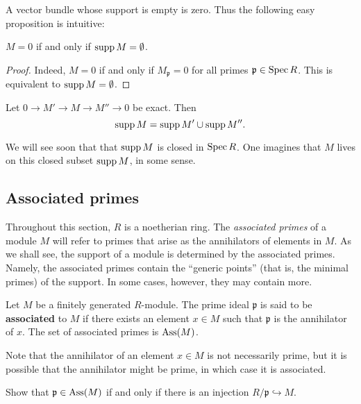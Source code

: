A vector bundle whose support is empty is zero. Thus the following easy
proposition is intuitive:

\begin{proposition} 
$M = 0$ if and only if $\operatorname{supp} M = \emptyset$. 
\end{proposition}
\begin{proof} 
Indeed, $M=0$ if and only if $M_{\mathfrak{p}} = 0$ for all primes
$\mathfrak{p} \in \operatorname{Spec} R$. This is equivalent to $\operatorname{supp} M = \emptyset$.
\end{proof} 
 
\begin{exercise} 
Let $0 \to M' \to M \to M'' \to 0$ be exact. Then 
\[ \operatorname{supp} M = \operatorname{supp} M' \cup \operatorname{supp} M''.  \]
\end{exercise} 


We will see soon that that $\operatorname{supp} M$ is closed in $\operatorname{Spec} R$. One imagines that
$M$ lives on this closed subset $\operatorname{supp} M$, in some sense.



\subsection{Associated primes}
Throughout this section, $R$ is a noetherian ring. The \emph{associated
primes} of a module $M$ will refer to primes that arise as the annihilators of
elements in $M$. As we shall see, the support of  a module is determined by
the associated primes. Namely, the associated primes contain the ``generic
points'' (that is, the minimal primes) of the support. In some cases, however,
they may contain more. 


\begin{definition} 
Let $M$ be a finitely generated $R$-module.  The prime ideal $\mathfrak{p}$ is said to be
\textbf{associated} to $M$ if there exists an element $x \in M$ such that
$\mathfrak{p}$ is the annihilator of $x$.  The set of associated primes is
$\operatorname{Ass}(M)$.
\end{definition} 

Note that the annihilator of an element $x \in M$ is not necessarily prime, but
it is possible that the annihilator might be prime, in which case it is
associated.

\begin{exercise} 
Show that $\mathfrak{p} \in \operatorname{Ass}(M)$ if and only if there is an injection
$R/\mathfrak{p} \hookrightarrow M$.
\end{exercise} 

